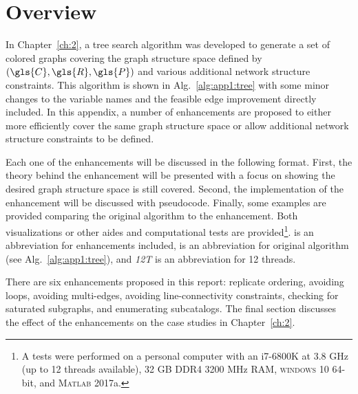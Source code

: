 \section{Overview}

In Chapter~\ref{ch:2}, a tree search algorithm was developed to generate a set of colored graphs covering the graph structure space defined by $(\gls{C},\gls{R},\gls{P})$ and various additional network structure constraints.
This algorithm is shown in Alg.~\ref{alg:app1:tree} with some minor changes to the variable names and the feasible edge improvement directly included.
In this appendix, a number of enhancements are proposed to either more efficiently cover the same graph structure space or allow additional network structure constraints to be defined.



Each one of the enhancements will be discussed in the following format. First, the theory behind the enhancement will be presented with a focus on showing the desired graph structure space is still covered. 
Second, the implementation of the enhancement will be discussed with pseudocode. 
Finally, some examples are provided comparing the original algorithm to the enhancement. Both visualizations or other aides and computational tests are provided\footnote{A tests were performed on a personal computer with an i7-6800K at 3.8 GHz (up to 12 threads available), 32 GB DDR4 3200 MHz RAM, \textsc{windows} 10 64-bit, and \textsc{Matlab} 2017a.}.
\textit{} is an abbreviation for enhancements included, \textit{} is an abbreviation for original algorithm (see Alg.~\ref{alg:app1:tree}), and \textit{12T} is an abbreviation for 12 threads.

There are six enhancements proposed in this report: replicate ordering, avoiding loops, avoiding multi-edges, avoiding line-connectivity constraints, checking for saturated subgraphs, and enumerating subcatalogs. The final section discusses the effect of the enhancements on the case studies in Chapter~\ref{ch:2}.